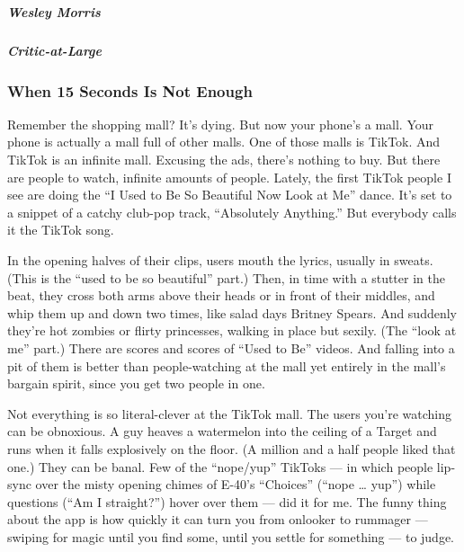 \hypertarget{wesley-morris}{%
\subparagraph{Wesley Morris}\label{wesley-morris}}

\hypertarget{critic-at-large-1}{%
\subparagraph{Critic-at-Large}\label{critic-at-large-1}}

\hypertarget{when-15-seconds-is-not-enough}{%
\subsubsection{When 15 Seconds Is Not
Enough}\label{when-15-seconds-is-not-enough}}

Remember the shopping mall? It's dying. But now your phone's a mall.
Your phone is actually a mall full of other malls. One of those malls is
TikTok. And TikTok is an infinite mall. Excusing the ads, there's
nothing to buy. But there are people to watch, infinite amounts of
people. Lately, the first TikTok people I see are doing the ``I Used to
Be So Beautiful Now Look at Me'' dance. It's set to a snippet of a
catchy club-pop track, ``Absolutely Anything.'' But everybody calls it
the TikTok song.

In the opening halves of their clips, users mouth the lyrics, usually in
sweats. (This is the ``used to be so beautiful'' part.) Then, in time
with a stutter in the beat, they cross both arms above their heads or in
front of their middles, and whip them up and down two times, like salad
days Britney Spears. And suddenly they're hot zombies or flirty
princesses, walking in place but sexily. (The ``look at me'' part.)
There are scores and scores of ``Used to Be'' videos. And falling into a
pit of them is better than people-watching at the mall yet entirely in
the mall's bargain spirit, since you get two people in one.

Not everything is so literal-clever at the TikTok mall. The users you're
watching can be obnoxious. A guy heaves a watermelon into the ceiling of
a Target and runs when it falls explosively on the floor. (A million and
a half people liked that one.) They can be banal. Few of the
``nope/yup'' TikToks --- in which people lip-sync over the misty opening
chimes of E-40's ``Choices'' (``nope \ldots{} yup'') while questions
(``Am I straight?'') hover over them --- did it for me. The funny thing
about the app is how quickly it can turn you from onlooker to rummager
--- swiping for magic until you find some, until you settle for
something --- to judge.


